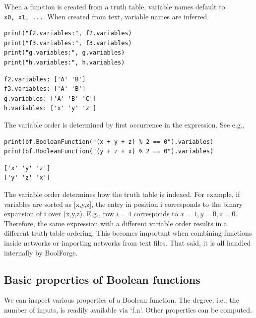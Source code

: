 \documentclass[
]{article}
\begin{document}
When a function is created from a truth table, variable names default to
\texttt{x0,\ x1,\ ...}. When created from text, variable names are
inferred.

\begin{lstlisting}
print("f2.variables:", f2.variables)
print("f3.variables:", f3.variables)
print("g.variables:", g.variables)
print("h.variables:", h.variables)
\end{lstlisting}

\begin{lstlisting}
f2.variables: ['A' 'B']
f3.variables: ['A' 'B']
g.variables: ['A' 'B' 'C']
h.variables: ['x' 'y' 'z']
\end{lstlisting}

The variable order is determined by first occurrence in the expression.
See e.g.,

\begin{lstlisting}
print(bf.BooleanFunction("(x + y + z) % 2 == 0").variables)
print(bf.BooleanFunction("(y + z + x) % 2 == 0").variables)
\end{lstlisting}

\begin{lstlisting}
['x' 'y' 'z']
['y' 'z' 'x']
\end{lstlisting}

The variable order determines how the truth table is indexed. For
example, if variables are sorted as {[}x,y,z{]}, the entry in position i
corresponds to the binary expansion of i over (x,y,z). E.g., row \(i=4\)
corresponds to \(x=1,y=0,z=0\). Therefore, the same expression with a
different variable order results in a different truth table ordering.
This becomes important when combining functions inside networks or
importing networks from text files. That said, it is all handled
internally by BoolForge.

\subsection{Basic properties of Boolean
functions}\label{basic-properties-of-boolean-functions}

We can inspect various properties of a Boolean function. The degree,
i.e., the number of inputs, is readily available via `f.n'. Other
properties can be computed.
\end{document}
